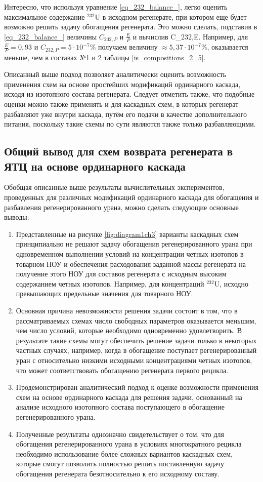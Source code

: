 Интересно, что используя уравнение \ref{eq_232_balance_}, легко оценить максимальное содержание $^{232}$U в исходном регенерате, при котором еще будет возможно решить задачу обогащения регенерата. Это можно сделать, подставив в \ref{eq_232_balance_} величины $C_{232,P}$ и $\frac{E}{P}$ и вычислив C_{232,E}. Например, для $\frac{E}{P}=0,93$ и $C_{232,P}=5\cdot10^{-7}\%$ получаем величину $\approx 5,37\cdot10^{-7}\%$, оказывается меньше, чем в составах №1 и 2 таблицы \ref{is_compositions_2_5}.

Описанный выше подход позволяет аналитически оценить возможность применения схем на основе простейших модификаций ординарного каскада, исходя из изотопного состава регенерата. Следует отметить также, что подобные оценки можно также применять и для каскадных схем, в которых регенерат разбавляют уже внутри каскада, путём его подачи в качестве дополнительного питания, поскольку такие схемы по сути являются также только разбавляющими.

\subsection{Общий вывод для схем возврата регенерата в ЯТЦ на основе ординарного каскада}\label{sec:ch2/sec2}

Обобщая описанные выше результаты вычислительных экспериментов, проведенных для различных модификаций ординарного каскада для обогащения и разбавления регенерированного урана, можно сделать следующие основные выводы:
\begin{enumerate}
  \item Представленные на рисунке \ref{fig:diagram1ch3} варианты каскадных схем принципиально не решают задачу обогащения регенерированного урана при одновременном выполнении условий на концентрации четных изотопов в товарном НОУ и обеспечения расходования заданной массы регенерата на получение этого НОУ для составов регенерата с исходным высоким содержанием четных изотопов. Например, для концентраций $^{232}$U, исходно превышающих предельные значения для товарного НОУ. 
  \item Основная причина невозможности решения задачи состоит в том, что в рассматриваемых схемах число свободных параметров оказывается меньшим, чем число условий, которые необходимо одновременно удовлетворить. В результате такие схемы могут обеспечить решение задачи только в некоторых частных случаях, например, когда в обогащение поступает регенерированный уран с относительно низкими исходными концентрациями четных изотопов, что может соответствовать обогащению регенерата первого рецикла.
  \item Продемонстрирован аналитический подход к оценке возможности применения схем на основе ординарного каскада для решения задачи, основанный на анализе исходного изотопного состава поступающего в обогащение регенерированного урана.
  \item Полученные результаты однозначно свидетельствует о том, что для обогащения регенерированного урана в условиях многократного рецикла необходимо использование более сложных вариантов каскадных схем, которые смогут позволить полностью решить поставленную задачу обогащения регенерата безотносительно к его исходному составу.
\end{enumerate}

